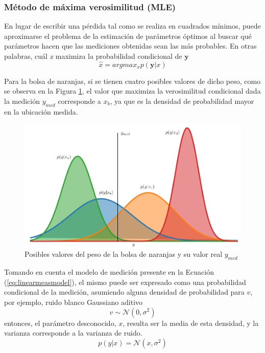 \subsubsection{Método de máxima verosimilitud (MLE)}

En lugar de escribir una pérdida tal como se realiza en cuadrados mínimos, puede aproximarse el problema de la estimación de parámetros óptimos al buscar qué parámetros hacen que las mediciones obtenidas sean las más probables. En otras palabras, cuál \textit{x} maximiza la probabilidad condicional de $\bm{y}$
\begin{equation}
    \hat{x} = argmax_x p(\bm{y}|x)
    \label{eq:maxlikelihood}
\end{equation}

Para la bolsa de naranjas, si se tienen cuatro posibles valores de dicho peso, como se observa en la Figura \ref{fig:mostlikelyproba}, el valor que maximiza la verosimilitud condicional dada la medición $y_{med}$ corresponde a $x_b$, ya que es la densidad de probabilidad mayor en la ubicación medida.
\begin{figure}[!h]
    \centering
    \includegraphics[width=\textwidth]{Img/MostLikelyProba.png}
    \caption{Posibles valores del peso de la bolsa de naranjas y su valor real $y_{med}$}
    \label{fig:mostlikelyproba}
\end{figure}

Tomando en cuenta el modelo de medición presente en la Ecuación (\ref{eq:linearmeasmodel}), el mismo puede ser expresado como una probabilidad condicional de la medición, asumiendo alguna densidad de probabilidad para $v$, por ejemplo, ruido blanco Gaussiano aditivo
\begin{equation}
    v \sim \mathcal{N}(0,\sigma^2)
\end{equation}
entonces, el parámetro desconocido, $x$, resulta ser la media de esta densidad, y la varianza corresponde a la varianza de ruido.
\begin{equation}
    p(y|x) = \mathcal{N}(x,\sigma^2)
\end{equation}

